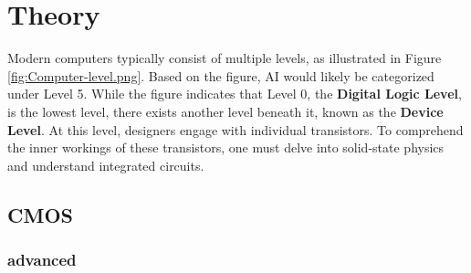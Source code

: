 \section{Theory}

Modern computers typically consist of multiple levels, as illustrated in Figure \ref{fig:Computer-level.png}. Based on the figure, AI would likely be categorized under Level 5. While the figure indicates that Level 0, the \textbf{Digital Logic Level}, is the lowest level, there exists another level beneath it, known as the \textbf{Device Level}. At this level, designers engage with individual transistors. To comprehend the inner workings of these transistors, one must delve into solid-state physics and understand integrated circuits.
\subsection{CMOS}
\subsubsection{advanced }

